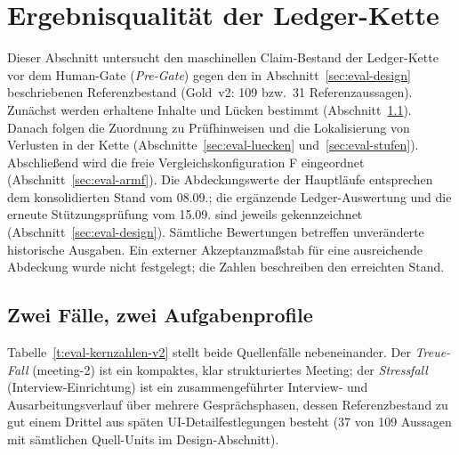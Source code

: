 \section{Ergebnisqualität der Ledger-Kette}
\label{sec:eval-ledgerqualitaet}

Dieser Abschnitt untersucht den maschinellen Claim-Bestand der
Ledger-Kette vor dem Human-Gate (\emph{Pre-Gate}) gegen den in
Abschnitt~\ref{sec:eval-design} beschriebenen Referenzbestand (Gold~v2: 109 bzw.\ 31
Referenzaussagen). Zunächst werden erhaltene Inhalte und Lücken
bestimmt (Abschnitt~\ref{sec:eval-kernzahlen}). Danach folgen die
Zuordnung zu Prüfhinweisen und die Lokalisierung von Verlusten in der
Kette (Abschnitte~\ref{sec:eval-luecken} und~\ref{sec:eval-stufen}).
Abschließend wird die freie Vergleichskonfiguration F eingeordnet
(Abschnitt~\ref{sec:eval-armf}). Die Abdeckungswerte der Hauptläufe
entsprechen dem konsolidierten Stand vom 08.09.; die ergänzende
Ledger-Auswertung und die erneute Stützungsprüfung vom 15.09. sind
jeweils gekennzeichnet (Abschnitt~\ref{sec:eval-design}). Sämtliche
Bewertungen betreffen unveränderte historische Ausgaben. Ein externer Akzeptanzmaßstab für eine ausreichende Abdeckung wurde
nicht festgelegt; die Zahlen beschreiben den erreichten Stand.

\subsection{Zwei Fälle, zwei Aufgabenprofile}
\label{sec:eval-kernzahlen}

Tabelle~\ref{t:eval-kernzahlen-v2} stellt beide Quellenfälle
nebeneinander. Der \emph{Treue-Fall} (meeting-2) ist ein kompaktes,
klar strukturiertes Meeting; der \emph{Stressfall}
(Interview-Einrichtung) ist ein zusammengeführter Interview- und
Ausarbeitungsverlauf über mehrere Gesprächsphasen, dessen
Referenzbestand zu gut einem Drittel aus späten
UI-Detailfestlegungen besteht (37 von 109 Aussagen mit sämtlichen
Quell-Units im Design-Abschnitt).



